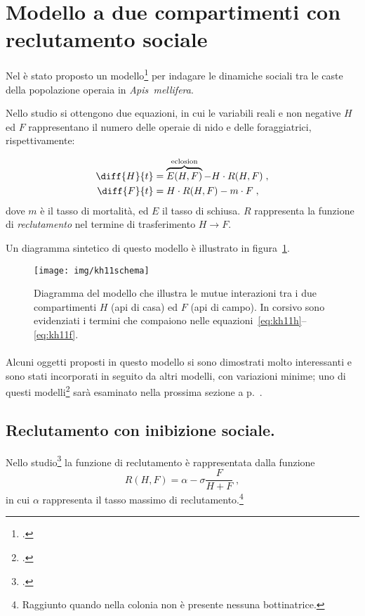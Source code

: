 \section[Modello a due compartimenti con reclutamento]{Modello a due compartimenti con reclutamento sociale}
\label{sec:kh11}

Nel \citeyear{khoury2011} è stato proposto un modello\footcite{khoury2011} per indagare le dinamiche sociali
tra le caste della popolazione operaia in \emph{Apis~mellifera}.

Nello studio si ottengono due equazioni, in cui le variabili reali e non negative $H$ ed $F$ rappresentano
il numero delle operaie di nido e delle foraggiatrici, rispettivamente:

\begin{align}
    \diff{H}{t} &= \overbrace{E(H,F)}^{\text{eclosion}}- H \cdot R(H,F) \label{eq:kh11h} \; , \\
    \diff{F}{t} &= H \cdot R(H,F)  - m \cdot F \label{eq:kh11f} \; ,
\end{align}
dove $m$ è il tasso di mortalità, ed $E$ il tasso di schiusa.
$R$ rappresenta la funzione di \emph{reclutamento} nel termine di
trasferimento $H \to F$.

Un diagramma sintetico di questo modello è illustrato in figura~\ref{img:kh11diagram}.
\begin{figure}[!h]
    \centering
    \texttt{[image: img/kh11schema]}

    \caption[Diagramma del modello a due compartimenti.]{Diagramma del modello che illustra le mutue interazioni
        tra i due compartimenti $H$ (api di casa) ed $F$ (api di campo).
        In corsivo sono evidenziati i termini che compaiono nelle equazioni~\eqref{eq:kh11h}--\eqref{eq:kh11f}.}
    \label{img:kh11diagram}
\end{figure}


\paragraph{}
Alcuni oggetti proposti in questo modello si sono dimostrati molto interessanti e sono stati incorporati
in seguito da altri modelli, con variazioni minime;
uno di questi modelli\footcite{ratti2017} sarà esaminato nella prossima sezione a p.~\pageref{sec:ratti17}.


\subsection{Reclutamento con inibizione sociale.}
\label{ssec:recr}
Nello studio\footcite{khoury2011} la funzione di reclutamento è rappresentata dalla funzione
\begin{equation}
    R(H,F) = \alpha - \sigma \frac{F}{H+F} \; ,
    \label{eq:Recr}
\end{equation}
in cui $\alpha$ rappresenta il tasso massimo di reclutamento.\footnote{Raggiunto quando nella colonia non è
presente nessuna bottinatrice.}

